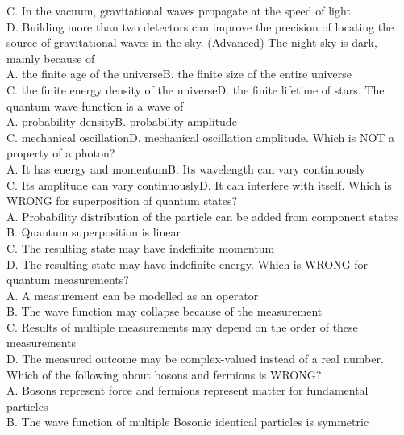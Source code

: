 \documentclass[12pt]{book} %
\numberwithin{equation}{chapter}
\def\mc{\hspace{0.5cm}}
\begin{document}
C. In the vacuum, gravitational waves propagate at the speed of light\\
D. Building more than two detectors can improve the precision of locating the source of gravitational
waves in the sky\bigskip{}. (Advanced) The night sky is dark, mainly because of\\
A. the finite age of the universe\mc B. the finite size of the entire universe\\
C. the finite energy density of the universe\mc D. the finite lifetime of stars\bigskip{}. The quantum wave function is a wave of\\
A. probability density\mc B. probability amplitude\\
C. mechanical oscillation\mc D. mechanical oscillation amplitude\bigskip{}. Which is NOT a property of a photon?\\
A. It has energy and momentum\mc B. Its wavelength can vary continuously\\
C. Its amplitude can vary continuously\mc D. It can interfere with itself\bigskip{}. Which is WRONG for superposition of quantum states?\\
A. Probability distribution of the particle can be added from component states\\
B. Quantum superposition is linear\\
C. The resulting state may have indefinite momentum\\
D. The resulting state may have indefinite energy\bigskip{}. Which is WRONG for quantum measurements?\\
A. A measurement can be modelled as an operator\\
B. The wave function may collapse because of the measurement\\
C. Results of multiple measurements may depend on the order of these measurements\\
D. The measured outcome may be complex-valued instead of a real number\bigskip{}. Which of the following about bosons and fermions is WRONG?\\
A. Bosons represent force and fermions represent matter for fundamental particles\\
B. The wave function of multiple Bosonic identical particles is symmetric\\
\end{document}
